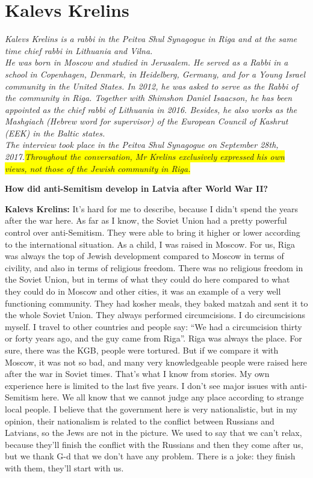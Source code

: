 \section{Kalevs Krelins}

\textit{Kalevs Krelins is a rabbi in the Peitva Shul Synagogue in Riga and at the same time chief rabbi in Lithuania and Vilna.\\
He was born in Moscow and studied in Jerusalem. He served as a Rabbi in a school in Copenhagen, Denmark, in Heidelberg, Germany, and for a Young Israel community in the United States. In 2012, he was asked to serve as the Rabbi of the community in Riga. Together with Shimshon Daniel Isaacson, he has been appointed as the chief rabbi of Lithuania in 2016. Besides, he also works as the \textit{Mashgiach} (Hebrew word for supervisor) of the European Council of Kashrut (EEK) in the Baltic states.\\
The interview took place in the Peitva Shul Synagogue on September 28th, 2017.\colorbox{yellow}{Throughout the conversation, Mr Krelins exclusively expressed his own}\\ \colorbox{yellow}{views, not those of the Jewish community in Riga.}} \par 
\vspace*{2em}
\textbf{How did anti-Semitism develop in Latvia after World War II?}  

\textbf{Kalevs Krelins:} It’s hard for me to describe, because I didn’t spend the years after the war here. As far as I know, the Soviet Union had a pretty powerful control over anti-Semitism. They were able to bring it higher or lower according to the international situation. As a child, I was raised in Moscow. For us, Riga was always the top of Jewish development compared to Moscow in terms of civility, and also in terms of religious freedom. There was no religious freedom in the Soviet Union, but in terms of what they could do here compared to what they could do in Moscow and other cities, it was an example of a very well functioning community. They had kosher meals, they baked matzah and sent it to the whole Soviet Union. They always performed circumcisions. I do circumcisions myself. I travel to other countries and people say: ``We had a circumcision thirty or forty years ago, and the guy came from Riga''. Riga was always the place. For sure, there was the KGB, people were tortured. But if we compare it with Moscow, it was not so bad, and many very knowledgeable people were raised here after the war in Soviet times. That’s what I know from stories. My own experience here is limited to the last five years. I don’t see major issues with anti-Semitism here.  We all know that we cannot judge any place according to strange local people. I believe that the government here is very nationalistic, but in my opinion, their nationalism is related to the conflict between Russians and Latvians, so the Jews are not in the picture. We used to say that we can’t relax, because they’ll finish the conflict with the Russians and then they come after us, but we thank G-d that we don’t have any problem. There is a joke: they finish with them, they’ll start with us.  

